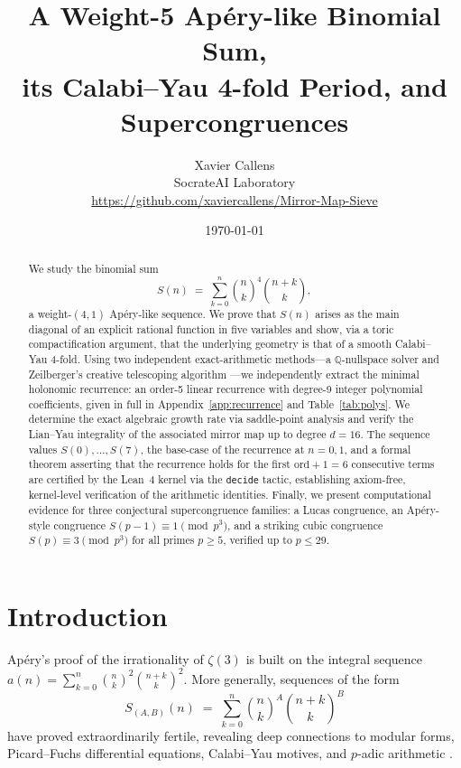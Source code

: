 \documentclass[11pt, a4paper]{article}
\title{A Weight-5 Ap\'ery-like Binomial Sum,\\
       its Calabi--Yau 4-fold Period, and Supercongruences}
\author{Xavier Callens \\
  SocrateAI Laboratory \\
  \url{https://github.com/xaviercallens/Mirror-Map-Sieve}}
\date{\today}
\begin{document}
\maketitle

\begin{abstract}
We study the binomial sum
\[
  S(n) \;=\; \sum_{k=0}^n \binom{n}{k}^4 \binom{n+k}{k},
\]
a weight-$(4,1)$ Ap\'ery-like sequence.  We prove that $S(n)$ arises as the
main diagonal of an explicit rational function in five variables and show, via
a toric compactification argument, that the underlying geometry is that of a
smooth Calabi--Yau 4-fold.  Using two independent exact-arithmetic methods---a
$\mathbb{Q}$-nullspace solver and Zeilberger's creative telescoping algorithm
\cite{PetkovsekWilfZeilberger1996}---we independently extract the minimal
holonomic recurrence: an order-5 linear recurrence with degree-9 integer
polynomial coefficients, given in full in Appendix~\ref{app:recurrence} and
Table~\ref{tab:polys}.  We determine the exact algebraic growth rate via
saddle-point analysis and verify the Lian--Yau integrality of the associated
mirror map up to degree $d=16$.  The sequence values $S(0),\dots,S(7)$, the
base-case of the recurrence at $n=0,1$, and a formal theorem asserting that
the recurrence holds for the first $\mathrm{ord}+1=6$ consecutive terms
are certified by the Lean~4 kernel via the \texttt{decide} tactic, establishing
axiom-free, kernel-level verification of the arithmetic identities.
Finally, we present computational evidence for three conjectural supercongruence
families: a Lucas congruence, an Ap\'ery-style congruence $S(p-1)\equiv
1\pmod{p^3}$, and a striking cubic congruence $S(p)\equiv 3\pmod{p^3}$ for
all primes $p\ge 5$, verified up to $p\le 29$.
\end{abstract}

\section{Introduction}

Ap\'ery's proof of the irrationality of $\zeta(3)$ \cite{vanderPoorten1979}
is built on the integral sequence
$a(n)=\sum_{k=0}^n\binom{n}{k}^2\binom{n+k}{k}^2$.
More generally, sequences of the form
\begin{equation}\label{eq:Sab}
  S_{(A,B)}(n) \;=\; \sum_{k=0}^n \binom{n}{k}^A \binom{n+k}{k}^B
\end{equation}
have proved extraordinarily fertile, revealing deep connections to modular
forms, Picard--Fuchs differential equations, Calabi--Yau motives, and
$p$-adic arithmetic \cite{Almkvist2005,Zagier2009,Straub2014,Osburn2016}.
\end{document}
